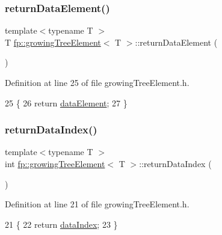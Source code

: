\subsubsection{\texorpdfstring{return\+Data\+Element()}{returnDataElement()}}
{\footnotesize\ttfamily template$<$typename T $>$ \\
T \hyperlink{classfp_1_1growingTreeElement}{fp\+::growing\+Tree\+Element}$<$ T $>$\+::return\+Data\+Element (\begin{DoxyParamCaption}{ }\end{DoxyParamCaption})\hspace{0.3cm}{\ttfamily [inline]}}



Definition at line 25 of file growing\+Tree\+Element.\+h.


\begin{DoxyCode}
25                                             \{
26                     \textcolor{keywordflow}{return} \hyperlink{classfp_1_1growingTreeElement_ae56213ef46269673e10a4046d7cfc7e4}{dataElement};
27                 \}
\end{DoxyCode}
\mbox{\label{classfp_1_1growingTreeElement_a9c18aa94771185dbd8b8bf12dde0070d}} 
\subsubsection{\texorpdfstring{return\+Data\+Index()}{returnDataIndex()}}
{\footnotesize\ttfamily template$<$typename T $>$ \\
int \hyperlink{classfp_1_1growingTreeElement}{fp\+::growing\+Tree\+Element}$<$ T $>$\+::return\+Data\+Index (\begin{DoxyParamCaption}{ }\end{DoxyParamCaption})\hspace{0.3cm}{\ttfamily [inline]}}



Definition at line 21 of file growing\+Tree\+Element.\+h.


\begin{DoxyCode}
21                                             \{
22                     \textcolor{keywordflow}{return} \hyperlink{classfp_1_1growingTreeElement_a8ba52aff2a9d11fa59a2544fd05c7d45}{dataIndex};
23                 \}
\end{DoxyCode}
\mbox{\label{classfp_1_1growingTreeElement_aa7d20a6d37bef8bbd573a946f664a5c2}} 
